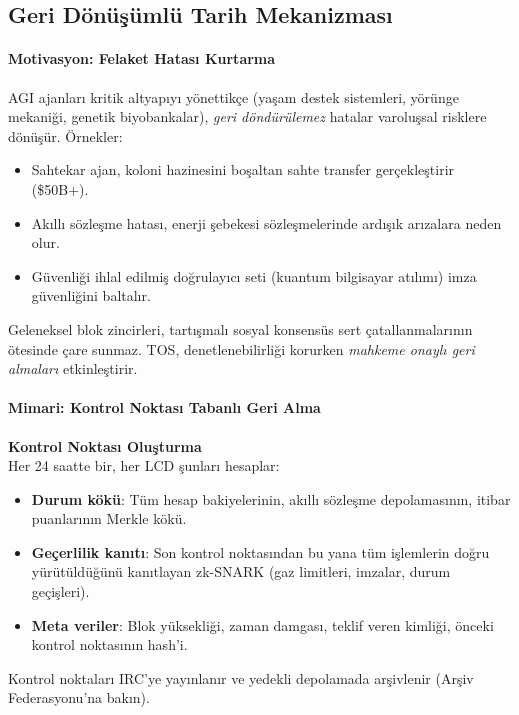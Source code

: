 \documentclass[11pt]{article}
\begin{document}
\subsection{Geri Dönüşümlü Tarih Mekanizması}

\paragraph{Motivasyon: Felaket Hatası Kurtarma}
AGI ajanları kritik altyapıyı yönettikçe (yaşam destek sistemleri, yörünge mekaniği, genetik biyobankalar), \emph{geri döndürülemez} hatalar varoluşsal risklere dönüşür. Örnekler:
\begin{itemize}[noitemsep]
  \item Sahtekar ajan, koloni hazinesini boşaltan sahte transfer gerçekleştirir (\$50B+).
  \item Akıllı sözleşme hatası, enerji şebekesi sözleşmelerinde ardışık arızalara neden olur.
  \item Güvenliği ihlal edilmiş doğrulayıcı seti (kuantum bilgisayar atılımı) imza güvenliğini baltalır.
\end{itemize}
Geleneksel blok zincirleri, tartışmalı sosyal konsensüs sert çatallanmalarının ötesinde çare sunmaz. TOS, denetlenebilirliği korurken \emph{mahkeme onaylı geri almaları} etkinleştirir.

\paragraph{Mimari: Kontrol Noktası Tabanlı Geri Alma}
\textbf{Kontrol Noktası Oluşturma}\\
Her 24 saatte bir, her LCD şunları hesaplar:
\begin{itemize}[noitemsep]
  \item \textbf{Durum kökü}: Tüm hesap bakiyelerinin, akıllı sözleşme depolamasının, itibar puanlarının Merkle kökü.
  \item \textbf{Geçerlilik kanıtı}: Son kontrol noktasından bu yana tüm işlemlerin doğru yürütüldüğünü kanıtlayan zk-SNARK (gaz limitleri, imzalar, durum geçişleri).
  \item \textbf{Meta veriler}: Blok yüksekliği, zaman damgası, teklif veren kimliği, önceki kontrol noktasının hash'i.
\end{itemize}
Kontrol noktaları IRC'ye yayınlanır ve yedekli depolamada arşivlenir (Arşiv Federasyonu'na bakın).
\end{document}
